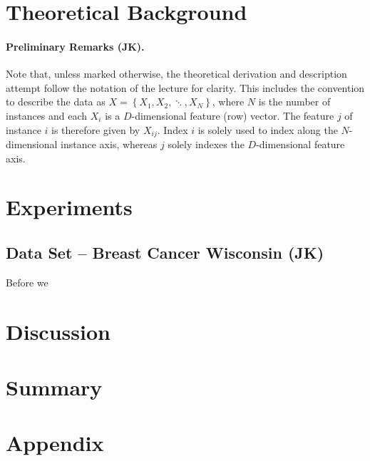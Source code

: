 \documentclass[11pt, a4paper]{scrartcl}
\begin{document}
\section{Theoretical Background}
\label{sec:theo}

\paragraph{Preliminary Remarks (JK).}
Note that, unless marked otherwise, the theoretical derivation and description attempt follow the notation of the lecture \cite{kothe2018foml} for clarity.
This includes the convention to describe the data as $X = \left\{ X_1, X_2, \ddots, X_N \right\}$, where $N$ is the number of instances and each $X_i$ is a $D$-dimensional feature (row) vector. The feature $j$  of instance $i$ is therefore given by $X_{ij}$.  Index $i$ is solely used to index along the $N$-dimensional instance axis, whereas $j$ solely indexes the $D$-dimensional feature axis.




\section{Experiments}
\label{sec:expe}

\subsection{Data Set -- Breast Cancer Wisconsin (JK)}
Before we 


\section{Discussion}
\label{sec:discu}

\section{Summary}

\section{Appendix}




\end{document}
